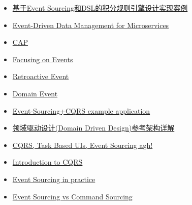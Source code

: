 \documentclass[12pt]{article}
\begin{document}
\begin{itemize}
\tightlist
\item
  \href{https://mp.weixin.qq.com/s?__biz=MzA5Nzc4OTA1Mw==&mid=2659597948&idx=1&sn=754df1597fd042537be8c25d073d3c98&scene=0\#rd}{基于Event Sourcing和DSL的积分规则引擎设计实现案例}
\item
  \href{https://www.nginx.com/blog/event-driven-data-management-microservices/}{Event-Driven Data Management for Microservices}
\item
  \href{https://en.wikipedia.org/wiki/CAP_theorem}{CAP}
\item
  \href{https://martinfowler.com/eaaDev/EventNarrative.html}{Focusing on Events}
\item
  \href{https://www.martinfowler.com/eaaDev/RetroactiveEvent.html}{Retroactive Event}
\item
  \href{https://www.martinfowler.com/eaaDev/DomainEvent.html}{Domain Event}
\item
  \href{https://github.com/cer/event-sourcing-examples}{Event-Sourcing+CQRS example application}
\item
  \href{http://kb.cnblogs.com/page/161050/}{领域驱动设计(Domain Driven Design)参考架构详解}
\item
  \href{http://codebetter.com/gregyoung/2010/02/16/cqrs-task-based-uis-event-sourcing-agh/}{CQRS, Task Based UIs, Event Sourcing agh!}
\item
  \href{www.codeproject.com/Articles/555855/Introduction-to-CQRS}{Introduction to CQRS}
\item
  \href{https://ookami86.github.io/event-sourcing-in-practice/}{Event Sourcing in practice}
\item
  \href{http://thinkbeforecoding.com/post/2013/07/28/Event-Sourcing-vs-Command-Sourcing}{Event Sourcing vs Command Sourcing}
\end{itemize}
\end{document}
